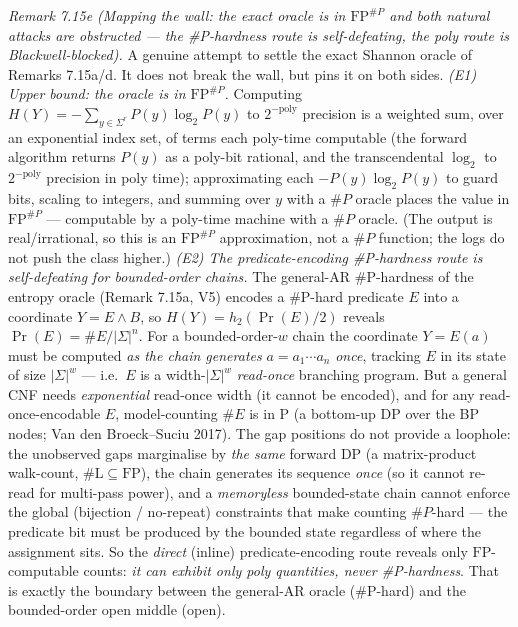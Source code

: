 \documentclass[
]{article}
\begin{document}
\emph{Remark 7.15e (Mapping the wall: the exact oracle is in $\mathrm{FP}^{\#P}$ and
both natural attacks are obstructed --- the \#P-hardness route is self-defeating, the
poly route is Blackwell-blocked).} A genuine attempt to settle the exact Shannon
oracle of Remarks 7.15a/d. It does not break the wall, but pins it on both sides.
\emph{(E1) Upper bound: the oracle is in $\mathrm{FP}^{\#P}$.} Computing
$H(Y)=-\sum_{y\in\Sigma^r}P(y)\log_2 P(y)$ to $2^{-\mathrm{poly}}$ precision is a
weighted sum, over an exponential index set, of terms each poly-time computable (the
forward algorithm returns $P(y)$ as a poly-bit rational, and the transcendental
$\log_2$ to $2^{-\mathrm{poly}}$ precision in poly time); approximating each
$-P(y)\log_2 P(y)$ to guard bits, scaling to integers, and summing over $y$ with a
$\#P$ oracle places the value in $\mathrm{FP}^{\#P}$ --- computable by a poly-time
machine with a $\#P$ oracle. (The output is real/irrational, so this is an
$\mathrm{FP}^{\#P}$ approximation, not a $\#P$ function; the logs do not push the
class higher.) \emph{(E2) The
predicate-encoding \#P-hardness route is self-defeating for bounded-order chains.}
The general-AR \#P-hardness of the entropy oracle (Remark 7.15a, V5) encodes a
\#P-hard predicate $E$ into a coordinate $Y=E\wedge B$, so $H(Y)=h_2(\Pr(E)/2)$
reveals $\Pr(E)=\#E/|\Sigma|^n$. For a bounded-order-$w$ chain the coordinate $Y=E(a)$
must be computed \emph{as the chain generates} $a=a_1\cdots a_n$ \emph{once}, tracking
$E$ in its state of size $|\Sigma|^w$ --- i.e.\ $E$ is a width-$|\Sigma|^w$
\emph{read-once} branching program. But a general CNF needs \emph{exponential}
read-once width (it cannot be encoded), and for any read-once-encodable $E$,
model-counting $\#E$ is in $\mathrm P$ (a bottom-up DP over the BP nodes;
Van den Broeck--Suciu 2017). The gap positions do not provide a loophole: the
unobserved gaps marginalise by \emph{the same} forward DP (a matrix-product
walk-count, $\#\mathrm L\subseteq\mathrm{FP}$), the chain generates its sequence
\emph{once} (so it cannot re-read for multi-pass power), and a \emph{memoryless}
bounded-state chain cannot enforce the global (bijection / no-repeat) constraints
that make counting $\#P$-hard --- the predicate bit must be produced by the bounded
state regardless of where the assignment sits. So the \emph{direct} (inline)
predicate-encoding route reveals only $\mathrm{FP}$-computable counts: \emph{it can
exhibit only poly quantities, never \#P-hardness}. That is exactly the boundary
between the general-AR oracle (\#P-hard) and the bounded-order open middle (open).
\end{document}
